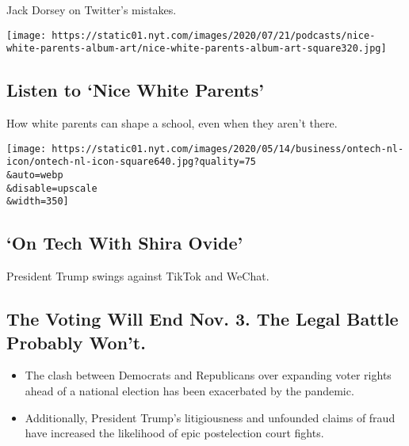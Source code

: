 Jack Dorsey on Twitter's mistakes.

\href{/2020/08/06/podcasts/episode-three-this-is-our-school-how-dare-you.html}{}

\texttt{[image: https://static01.nyt.com/images/2020/07/21/podcasts/nice-white-parents-album-art/nice-white-parents-album-art-square320.jpg]}

\href{/2020/08/06/podcasts/episode-three-this-is-our-school-how-dare-you.html}{}

\hypertarget{listen-to-nice-white-parents}{%
\subsection{Listen to `Nice White
Parents'}\label{listen-to-nice-white-parents}}

How white parents can shape a school, even when they aren't there.

\href{/2020/08/07/technology/trump-tiktok-wechat.html}{}

\texttt{[image: https://static01.nyt.com/images/2020/05/14/business/ontech-nl-icon/ontech-nl-icon-square640.jpg?quality=75\\\&auto=webp\\\&disable=upscale\\\&width=350]}

\href{/2020/08/07/technology/trump-tiktok-wechat.html}{}

\hypertarget{on-tech-with-shira-ovide}{%
\subsection{`On Tech With Shira Ovide'}\label{on-tech-with-shira-ovide}}

President Trump swings against TikTok and WeChat.

\href{/2020/08/08/us/politics/voting-nov-3-election.html}{}

\hypertarget{the-voting-will-end-nov-3-the-legal-battle-probably-wont}{%
\subsection{The Voting Will End Nov. 3. The Legal Battle Probably
Won't.}\label{the-voting-will-end-nov-3-the-legal-battle-probably-wont}}

\begin{itemize}
\tightlist
\item
  The clash between Democrats and Republicans over expanding voter
  rights ahead of a national election has been exacerbated by the
  pandemic.
\item
  Additionally, President Trump's litigiousness and unfounded claims of
  fraud have increased the likelihood of epic postelection court fights.
\end{itemize}

